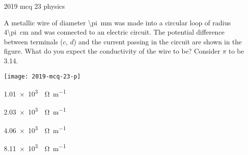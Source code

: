 \ylDisplay
{}%
{2019}%
{mcq}%
{23}%
{physics}%
{}%
{
\ifStatement
A metallic wire of diameter \SI{\pi}{\mm} was made into a circular loop of radius \SI{4\pi}{\cm} and was connected to an electric circuit. The potential difference between  terminals ($c$, $d$) and the current passing in the circuit are shown in the figure. What do you expect the conductivity of the wire to be? Consider $\pi$ to be \num{3.14}.
\begin{center}
  \texttt{[image: 2019-mcq-23-p]}
\end{center}
\fi


\SI{1.01e3}{\per\ohm\per\m}
\fi


\SI{2.03e3}{\per\ohm\per\m}
\fi


\SI{4.06e3}{\per\ohm\per\m}
\fi


\SI{8.11e3}{\per\ohm\per\m}
\fi


\ifHint

\fi


\ifSolution

\fi


\ifEstStatement

\fi



\fi



\fi



\fi



\fi


\ifEstHint

\fi


\ifEstSolution

\fi
}
